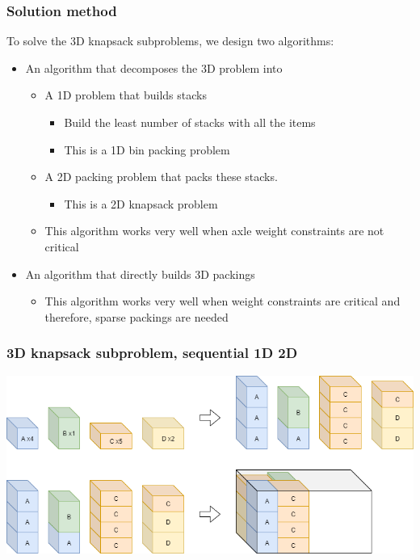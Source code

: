 \documentclass[10pt]{beamer}
\begin{document}
\begin{frame}
  \frametitle{Solution method}

  To solve the 3D knapsack subproblems, we design two algorithms:
  \begin{itemize}
    \item An algorithm that decomposes the 3D problem into
      \begin{itemize}
        \item A 1D problem that builds stacks
          \begin{itemize}
            \item Build the least number of stacks with all the items
            \item This is a 1D bin packing problem
          \end{itemize}
        \item A 2D packing problem that packs these stacks.
          \begin{itemize}
            \item This is a 2D knapsack problem
          \end{itemize}
        \item This algorithm works very well when axle weight constraints are not critical
      \end{itemize}
    \item An algorithm that directly builds 3D packings
      \begin{itemize}
        \item This algorithm works very well when weight constraints are critical and therefore, sparse packings are needed
      \end{itemize}
  \end{itemize}
\end{frame}

\begin{frame}
  \frametitle{3D knapsack subproblem, sequential 1D 2D}

  \begin{center}
    \includegraphics[width=\textwidth]{img/sequantial_1d_2d.png}
  \end{center}
\end{frame}
\end{document}
